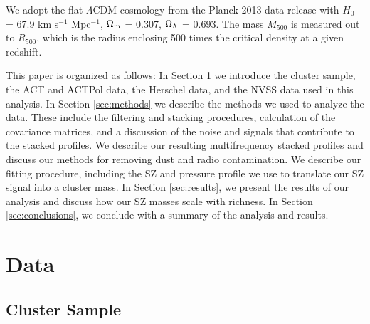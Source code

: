 \documentclass[a4paper,fleqn,usenatbib]{mnras}
\begin{document}
We adopt the flat $\Lambda$CDM cosmology from the Planck 2013 data release \citep{2014A&A...571A..16P} with $H_{0}$ = 67.9 km s$^{-1}$ Mpc$^{-1}$, $\Omega_{\rm m}$ = 0.307, $\Omega_{\rm \Lambda}$ = 0.693. 
The  mass $M_{500}$ is measured out to $R_{500}$, which is the radius enclosing 500 times the critical density at a given redshift.


This paper is organized as follows: In Section \ref{sec:data} we introduce the cluster sample, the ACT and ACTPol data, the Herschel data, and the NVSS data used in this analysis. 
In Section \ref{sec:methods} we describe the methods we used to analyze the data. 
These include the filtering and stacking procedures, calculation of the covariance matrices, and a discussion of the noise and signals that contribute to the stacked profiles. 
We describe our resulting multifrequency stacked profiles 
and discuss our methods for removing dust and radio contamination. 
We describe our fitting procedure, including the SZ and pressure profile we use to translate our SZ signal into a cluster mass. 
In Section \ref{sec:results}, we present the results of our analysis and discuss how our SZ masses scale with richness. 
In Section \ref{sec:conclusions}, we conclude with a summary of the analysis and results.


\section{Data} \label{sec:data}

\subsection{Cluster Sample}
\end{document}
